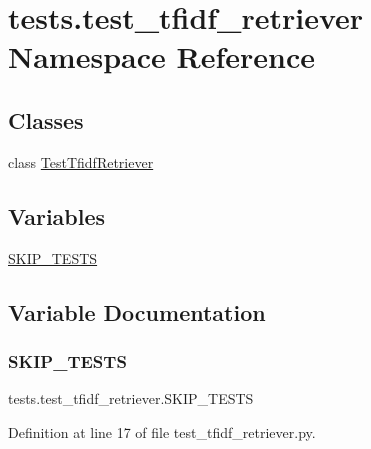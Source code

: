 \hypertarget{namespacetests_1_1test__tfidf__retriever}{}\section{tests.\+test\+\_\+tfidf\+\_\+retriever Namespace Reference}
\label{namespacetests_1_1test__tfidf__retriever}
\subsection*{Classes}
\begin{DoxyCompactItemize}
\item 
class \hyperlink{classtests_1_1test__tfidf__retriever_1_1TestTfidfRetriever}{Test\+Tfidf\+Retriever}
\end{DoxyCompactItemize}
\subsection*{Variables}
\begin{DoxyCompactItemize}
\item 
\hyperlink{namespacetests_1_1test__tfidf__retriever_a6a955f56e751898a5884944873facfd2}{S\+K\+I\+P\+\_\+\+T\+E\+S\+TS}
\end{DoxyCompactItemize}


\subsection{Variable Documentation}
\mbox{\label{namespacetests_1_1test__tfidf__retriever_a6a955f56e751898a5884944873facfd2}} 
\subsubsection{\texorpdfstring{S\+K\+I\+P\+\_\+\+T\+E\+S\+TS}{SKIP\_TESTS}}
{\footnotesize\ttfamily tests.\+test\+\_\+tfidf\+\_\+retriever.\+S\+K\+I\+P\+\_\+\+T\+E\+S\+TS}



Definition at line 17 of file test\+\_\+tfidf\+\_\+retriever.\+py.

